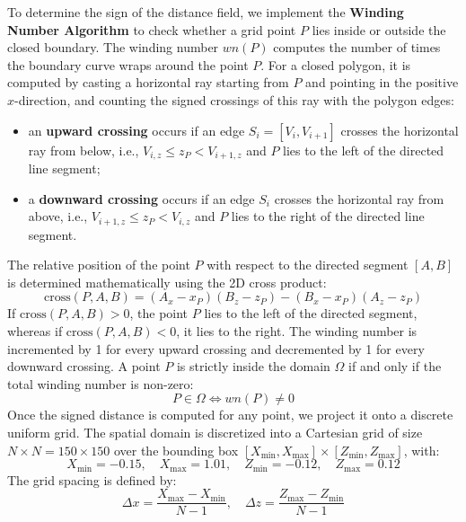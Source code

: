 To determine the sign of the distance field, we implement the \textbf{Winding Number Algorithm} to check whether a grid point $P$ lies inside or outside the closed boundary. The winding number $wn(P)$ computes the number of times the boundary curve wraps around the point $P$. For a closed polygon, it is computed by casting a horizontal ray starting from $P$ and pointing in the positive $x$-direction, and counting the signed crossings of this ray with the polygon edges:
\begin{itemize}
    \item[-] an \textbf{upward crossing} occurs if an edge $S_i = [V_i, V_{i+1}]$ crosses the horizontal ray from below, i.e., $V_{i, z} \le z_P < V_{i+1, z}$ and $P$ lies to the left of the directed line segment;
    \item[-] a \textbf{downward crossing} occurs if an edge $S_i$ crosses the horizontal ray from above, i.e., $V_{i+1, z} \le z_P < V_{i, z}$ and $P$ lies to the right of the directed line segment.
\end{itemize}
The relative position of the point $P$ with respect to the directed segment $[A, B]$ is determined mathematically using the 2D cross product:
\begin{equation}
    \text{cross}(P, A, B) = (A_x - x_P)(B_z - z_P) - (B_x - x_P)(A_z - z_P)
    \label{eq:cross_product}
\end{equation}
If $\text{cross}(P, A, B) > 0$, the point $P$ lies to the left of the directed segment, whereas if $\text{cross}(P, A, B) < 0$, it lies to the right. The winding number is incremented by 1 for every upward crossing and decremented by 1 for every downward crossing. A point $P$ is strictly inside the domain $\Omega$ if and only if the total winding number is non-zero:
\begin{equation}
    P \in \Omega \iff wn(P) \ne 0
\end{equation}
Once the signed distance is computed for any point, we project it onto a discrete uniform grid. The spatial domain is discretized into a Cartesian grid of size $N \times N = 150 \times 150$ over the bounding box $[X_{\min}, X_{\max}] \times [Z_{\min}, Z_{\max}]$, with:
\begin{equation}
    X_{\min} = -0.15, \quad X_{\max} = 1.01, \quad Z_{\min} = -0.12, \quad Z_{\max} = 0.12
\end{equation}
The grid spacing is defined by:
\begin{equation}
    \Delta x = \frac{X_{\max} - X_{\min}}{N-1}, \quad \Delta z = \frac{Z_{\max} - Z_{\min}}{N-1}
\end{equation}

